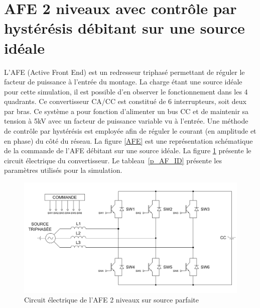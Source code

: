 \clearpage
\section{AFE 2 niveaux avec contrôle par hystérésis débitant sur une source idéale}
L'AFE (Active Front End) est un redresseur triphasé permettant de réguler le facteur de puissance à l'entrée du montage. La charge étant une source idéale pour cette simulation, il est possible d'en observer le fonctionnement dans les 4 quadrants. Ce convertisseur CA/CC est constitué de 6 interrupteurs, soit deux par bras. Ce système a pour fonction d'alimenter un bus CC et de maintenir sa tension à 5kV avec un facteur de puissance variable vu à l'entrée. Une méthode de contrôle par hystérésis est employée afin de réguler le courant (en amplitude et en phase) du côté du réseau. La figure \ref{AFE} est une représentation schématique de la commande de l'AFE débitant sur une source idéale. La figure \ref{circuit_AFE_IDEAL} présente le circuit électrique du convertisseur. Le tableau~\ref{p_AF_ID} présente les paramètres utilisés pour la simulation.

\begin{figure}[htb]
\centering
\includegraphics[scale=0.6]{fig/AFE_IDEAL.png}
\caption{Circuit électrique de l'AFE 2 niveaux sur source parfaite}
\label{circuit_AFE_IDEAL}
\end{figure}


